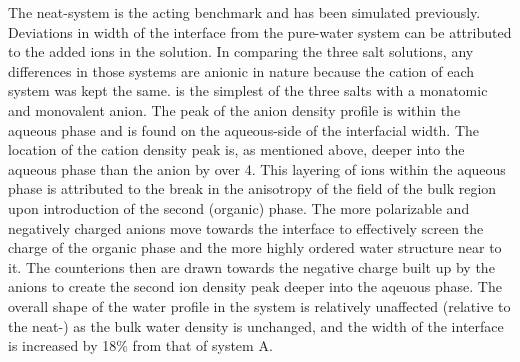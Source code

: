 The neat-\wat system is the acting benchmark and has been simulated previously.\cite{Wick2006c,Hore2008,Wick2008a} Deviations in width of the interface from the pure-water system can be attributed to the added ions in the solution. In comparing the three salt solutions, any differences in those systems are anionic in nature because the cation of each system was kept the same. \nacl is the simplest of the three salts with a monatomic and monovalent anion. The peak of the anion density profile is within the aqueous phase and is found on the aqueous-side of the interfacial width. The location of the cation density peak is, as mentioned above, deeper into the aqueous phase than the anion by over 4\angs. This layering of ions within the aqueous phase is attributed to the break in the anisotropy of the field of the bulk region upon introduction of the second (organic) phase. The more polarizable and negatively charged anions move towards the interface to effectively screen the charge of the organic phase and the more highly ordered water structure near to it. The counterions then are drawn towards the negative charge built up by the anions to create the second ion density peak deeper into the aqeuous phase. The overall shape of the water profile in the \nacl system is relatively unaffected (relative to the neat-\wat) as the bulk water density is unchanged, and the width of the interface is increased by 18\% from that of system A. 

